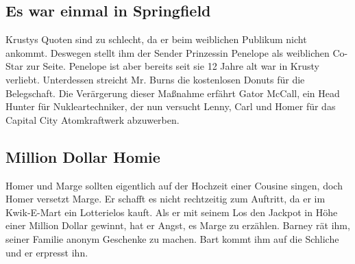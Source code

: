 
\subsection{Es war einmal in Springfield}\label{LABF20}
Krustys Quoten sind zu schlecht, da er beim weiblichen Publikum nicht ankommt. Deswegen stellt ihm der Sender Prinzessin Penelope als weiblichen Co-Star zur Seite. Penelope ist aber bereits seit sie 12 Jahre alt war in Krusty verliebt. Unterdessen streicht Mr. Burns die kostenlosen Donuts für die Belegschaft. Die Verärgerung dieser Maßnahme erfährt Gator McCall, ein Head Hunter für Nukleartechniker, der nun versucht Lenny, Carl und Homer für das Capital City Atomkraftwerk abzuwerben.


\subsection{Million Dollar Homie}
Homer und Marge sollten eigentlich auf der Hochzeit einer Cousine singen, doch Homer versetzt Marge. Er schafft es nicht rechtzeitig zum Auftritt, da er im Kwik-E-Mart ein Lotterielos kauft. Als er mit seinem Los den Jackpot in Höhe einer Million Dollar gewinnt, hat er Angst, es Marge zu erzählen. Barney rät ihm, seiner Familie anonym Geschenke zu machen. Bart kommt ihm auf die Schliche und er erpresst ihn.

